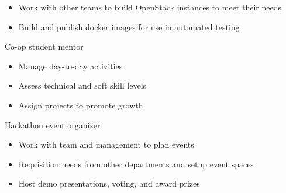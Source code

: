 \begin{cventries}
{\begin{cvitems}
\begin{itemize}
                \item {Work with other teams to build OpenStack instances to meet their needs}
                \item {Build and publish docker images for use in automated testing}
            \end{itemize}
        \item {Co-op student mentor}
            \begin{itemize}
                \item {Manage day-to-day activities}
                \item {Assess technical and soft skill levels}
                \item {Assign projects to promote growth}
            \end{itemize}
        \item {Hackathon event organizer}
            \begin{itemize}
                \item {Work with team and management to plan events}
                \item {Requisition needs from other departments and setup event spaces}
                \item {Host demo presentations, voting, and award prizes}
            \end{itemize}
      \end{cvitems}
    }


\end{cventries}
